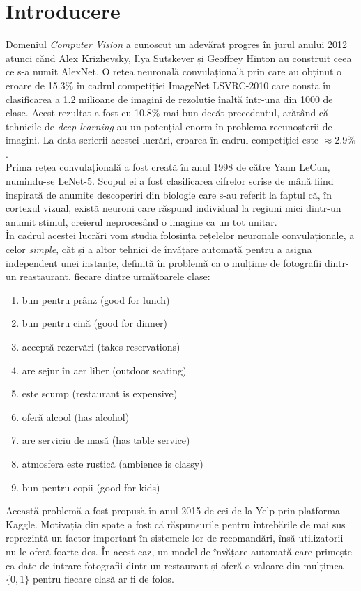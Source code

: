 \documentclass[11pt]{article}
\begin{document}
\section{Introducere}
Domeniul \textit{Computer Vision} a cunoscut un adevărat progres în jurul anului 2012 atunci cănd Alex Krizhevsky, Ilya Sutskever și Geoffrey Hinton au construit ceea ce s-a numit AlexNet. O rețea neuronală convulațională prin care au obținut o eroare de 15.3\% în cadrul competiției ImageNet LSVRC-2010 care constă în clasificarea a 1.2 milioane de imagini de rezoluție înaltă într-una din 1000 de clase. Acest rezultat a fost cu 10.8\% mai bun decăt precedentul, arătând că tehnicile de \textit{deep learning} au un potențial enorm în problema recunoșterii de imagini. La data scrierii acestei lucrări, eroarea în cadrul competiției este $\approx 2.9\%$.\\

Prima rețea convulațională a fost creată în anul 1998 de către Yann LeCun, numindu-se LeNet-5. Scopul ei a fost clasificarea cifrelor scrise de mână fiind inspirată de anumite descoperiri din biologie care s-au referit la faptul că, în cortexul vizual, există neuroni care răspund individual la regiuni mici dintr-un anumit stimul, creierul neprocesând o imagine ca un tot unitar.\\

În cadrul acestei lucrări vom studia folosința rețelelor neuronale convulaționale, a celor \textit{simple}, căt și a altor tehnici de învățare automată pentru a asigna independent unei instanțe, definită în problemă ca o mulțime de fotografii dintr-un reastaurant, fiecare dintre următoarele clase:\\

\begin{enumerate}
\item bun pentru prânz (good for lunch)
\item bun pentru cină (good for dinner)
\item acceptă rezervări (takes reservations)
\item are sejur în aer liber (outdoor seating)
\item este scump (restaurant is expensive)
\item oferă alcool (has alcohol)
\item are serviciu de masă (has table service)
\item atmosfera este rustică (ambience is classy)
\item bun pentru copii (good for kids)
\end{enumerate}

Această problemă a fost propusă în anul 2015 de cei de la Yelp prin platforma Kaggle. Motivația din spate a fost că răspunsurile pentru întrebările de mai sus reprezintă un factor important în sistemele lor de recomandări, însă utilizatorii nu le oferă foarte des. În acest caz, un model de învățare automată care primește ca date de intrare fotografii dintr-un restaurant și oferă o valoare din mulțimea $\{0, 1\}$ pentru fiecare clasă ar fi de folos. 
\end{document}
